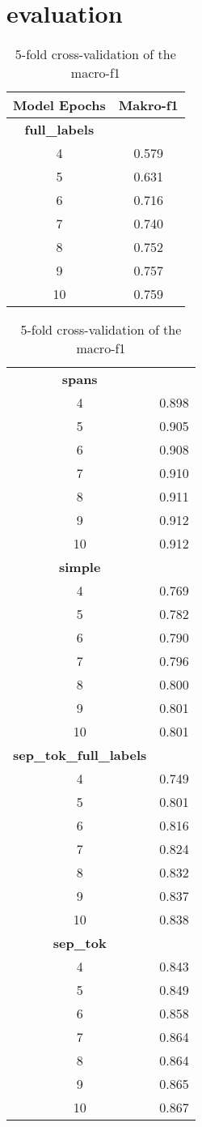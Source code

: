 \documentclass[12]{article}
\theoremstyle{mytheoremstyle}
\theoremstyle{mytheoremstyle}
\theoremstyle{myproblemstyle}
\begin{document}
  \section{evaluation}
  \begin{table}[!h]
    \centering
    \begin{tabular}{c|c} 
      \textbf{Model Epochs} &  \textbf{Makro-f1}\\ 
      \hline
      \hline
      \textbf{full\_labels} & \\
      4 & 0.579\\
      5 & 0.631\\
      6 & 0.716\\
      7 & 0.740\\
      8 & 0.752\\
      9 & 0.757\\
      10 & 0.759\\
    \end{tabular}
    \quad
    \begin{tabular}{c|c} 
      \hline
      \textbf{spans} & \\
      4 & 0.898\\
      5 & 0.905\\
      6 & 0.908\\
      7 & 0.910\\
      8 & 0.911\\
      9 & 0.912\\
      10 & 0.912\\
      \hline
      \textbf{simple} & \\
      4 & 0.769\\
      5 & 0.782\\
      6 & 0.790\\
      7 & 0.796\\
      8 & 0.800\\
      9 & 0.801\\
      10 & 0.801\\
      \hline
      \textbf{sep\_tok\_full\_labels} & \\
      4 & 0.749\\
      5 & 0.801\\
      6 & 0.816\\
      7 & 0.824\\
      8 & 0.832\\
      9 & 0.837\\
      10 & 0.838\\
      \hline
      \textbf{sep\_tok} & \\
      4 & 0.843\\
      5 & 0.849\\
      6 & 0.858\\
      7 & 0.864\\
      8 & 0.864\\
      9 & 0.865\\
      10 & 0.867\\
    \end{tabular}
    \caption{5-fold cross-validation of the macro-f1}
    \label{tab:my_label}
  \end{table}
\end{document}
